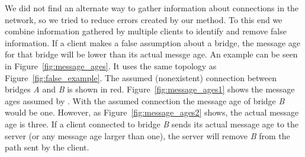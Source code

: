 We did not find an alternate way to gather information about connections in the network, so we tried to reduce errors created by our method.
To this end we combine information gathered by multiple clients to identify and remove false information.
If a client makes a false assumption about a bridge, the message age for that bridge will be lower than its actual messge age.
An example can be seen in Figure~\ref{fig:message_ages}.
It uses the same topology as Figure~\ref{fig:false_example}.
The assumed (nonexistent) connection between bridges \textit{A} and \textit{B} is shown in red.
Figure~\ref{fig:message_ages1} shows the message ages assumed by \tool.
With the assumed connection the message age of bridge \textit{B} would be one.
However, as Figure~\ref{fig:message_ages2} shows, the actual message age is three.
If a client connected to bridge \textit{B} sends its actual message age to the server (or any message age larger than one), the server will remove \textit{B} from the path sent by the client.
